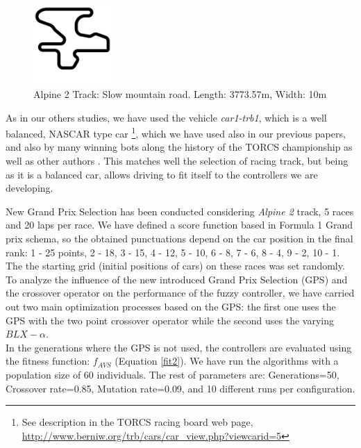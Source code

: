\documentclass[10pt,journal,compsoc]{IEEEtran}
\begin{document}
\begin{figure}[!ht]	
	\begin{center}
		\includegraphics[width=3cm]{fig/alpine2.jpg}
		\caption{Alpine 2 Track: Slow mountain road. Length: 3773.57m, Width: 10m}
		\label{fig:alpine2_track}	
	\end{center}	
\end{figure}

As in our others studies, we have used the vehicle \textit{car1-trb1},
which is a well balanced, NASCAR type car \footnote{See description in
  the TORCS racing board web page,
  \url{http://www.berniw.org/trb/cars/car_view.php?viewcarid=5}},
which we have used also in our previous papers, and also by many
winning bots along the history of the TORCS championship
\cite{torcs5} as well as other authors
\cite{auteur2010,li2019reinforcement}. This matches well the selection
of racing track, but being as it is a balanced car, allows driving to
fit itself to the controllers we are developing.

New Grand Prix Selection has been conducted considering \textit{Alpine 2} track, 5 races and 20 laps per race. 
We have defined a score function based in Formula 1 Grand prix schema, so the obtained punctuations depend on the car position in the final rank: 1 - 25 points, 2 - 18, 3 - 15, 4 - 12, 5 - 10, 6 - 8, 7 - 6, 8 - 4, 9 - 2, 10 - 1. The the starting grid (initial positions of cars) on these races was set randomly.\\

To analyze the influence of the new introduced Grand Prix Selection (GPS) and the crossover operator on the performance of the fuzzy controller, we have carried out  two main optimization processes based on the GPS: the first one uses the GPS with the two point crossover operator while the second uses the varying $BLX-\alpha$. \\
In the generations where the GPS is not used, the controllers are evaluated using the fitness function: $f_{AVS}$ (Equation \ref{fit2}).
We have run the algorithms with a population size of 60
individuals. The rest of parameters are: Generations=50, Crossover
rate=0.85, Mutation rate=0.09, and 10 different runs per
configuration. %
\end{document}
